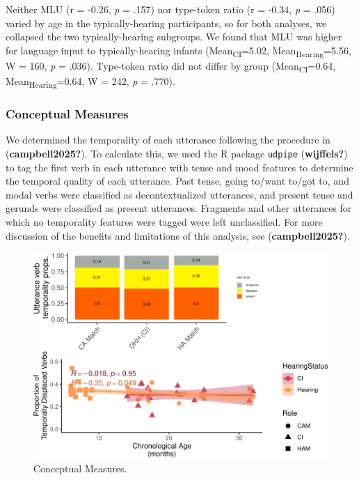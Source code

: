 \documentclass[
  man,floatsintext]{apa6}
\begin{document}
Neither MLU (r = -0.26, \emph{p} = .157) nor type-token ratio (r = -0.34, \emph{p} = .056) varied by age in the typically-hearing participants, so for both analyses, we collapsed the two typically-hearing subgroups. We found that MLU was higher for language input to typically-hearing infants (Mean\textsubscript{CI}=5.02, Mean\textsubscript{Hearing}=5.56, W = 160, \emph{p} = .036). Type-token ratio did not differ by group (Mean\textsubscript{CI}=0.64, Mean\textsubscript{Hearing}=0.64, W = 242, \emph{p} = .770).

\subsubsection{Conceptual Measures}\label{conceptual-measures}

We determined the temporality of each utterance following the procedure in (\textbf{campbell2025?}). To calculate this, we used the R package \texttt{udpipe} (\textbf{wijffels?}) to tag the first verb in each utterance with tense and mood features to determine the temporal quality of each utterance. Past tense, going to/want to/got to, and modal verbs were classified as decontextualized utterances, and present tense and gerunds were classified as present utterances. Fragments and other utterances for which no temporality features were tagged were left unclassified. For more discussion of the benefits and limitations of this analysis, see (\textbf{campbell2025?}).

\begin{figure}
\centering
\includegraphics{DHH_Input_files/figure-latex/conceptual-plot-1.pdf}
\caption{\label{fig:conceptual-plot}Conceptual Measures.}
\end{figure}
\end{document}
